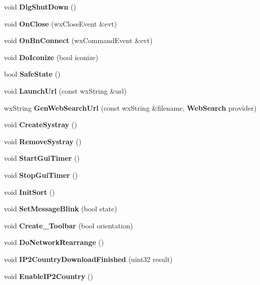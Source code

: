 \begin{DoxyCompactItemize}
\item 
void {\bfseries DlgShutDown} ()\label{classCamuleDlg_ac92b06857ad1499a6992cbeea4c968dc}

\item 
void {\bfseries OnClose} (wxCloseEvent \&evt)\label{classCamuleDlg_a4dd3ae918f73f048a42b0453526e4b00}

\item 
void {\bfseries OnBnConnect} (wxCommandEvent \&evt)\label{classCamuleDlg_a366c13bbbc596163f7cf8c8a3461190f}

\item 
void {\bfseries DoIconize} (bool iconize)\label{classCamuleDlg_ae81dece09b8fa1fb1609c7ea3e58f2fa}

\item 
bool {\bfseries SafeState} ()\label{classCamuleDlg_a1b148db0f035598d9a1c631bea3c73a6}

\item 
void {\bfseries LaunchUrl} (const wxString \&url)\label{classCamuleDlg_a6158c7e2c76f1f503a61d5176a2123f7}

\item 
wxString {\bfseries GenWebSearchUrl} (const wxString \&filename, {\bf WebSearch} provider)\label{classCamuleDlg_a2c22f42f500f6507f64be77f8e0c5eb3}

\item 
void {\bfseries CreateSystray} ()\label{classCamuleDlg_a2a8d6699066e5ce568038a84af58ed51}

\item 
void {\bfseries RemoveSystray} ()\label{classCamuleDlg_a7068a5b4f824c71e92b5b69777d7e5cd}

\item 
void {\bfseries StartGuiTimer} ()\label{classCamuleDlg_ac7c463621860d7200ff801d0b6f1867b}

\item 
void {\bfseries StopGuiTimer} ()\label{classCamuleDlg_a6dd49b9508e724cb5337f0f3fd616e57}

\item 
void {\bf InitSort} ()\label{classCamuleDlg_a4efae5fc25a5c78c0bc03c857f29c012}

\item 
void {\bfseries SetMessageBlink} (bool state)\label{classCamuleDlg_a274a129f16b1ad53241c53d907cb29ea}

\item 
void {\bfseries Create\_\-Toolbar} (bool orientation)\label{classCamuleDlg_add10fd057f091e3467d01dee38bdbcd1}

\item 
void {\bfseries DoNetworkRearrange} ()\label{classCamuleDlg_a0a6f788cf9c3a94dc40e739ba299b8c0}

\item 
void {\bfseries IP2CountryDownloadFinished} (uint32 result)\label{classCamuleDlg_a95a127c28201ef33b93848dcd63d9fa1}

\item 
void {\bfseries EnableIP2Country} ()\label{classCamuleDlg_aeef723191670bc91ed58aa65a0b33535}

\end{DoxyCompactItemize}
